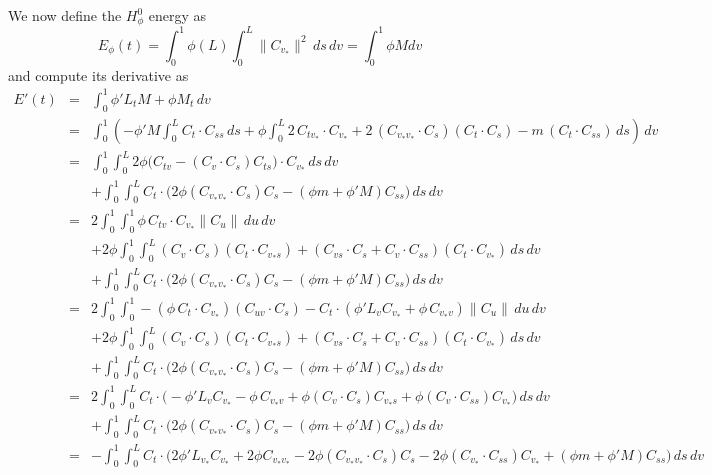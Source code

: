 \documentclass[twoside,a4paper,english]{article}
\def\v{{v_*}}
\begin{document}
We now define the $H^0_\phi$ energy as
\begin{equation}
  E_{\phi}(t)=\int_0^1 \phi(L) \int_0^L \big\|C_{\v}\big\|^2\,ds\,dv
      =\int_0^1 \phi M dv
\end{equation}
and compute its derivative as
\begin{eqnarray*}
  E'(t)
  &=& \int_0^1 \phi'L_t M+\phi M_t\,dv  \\
  &=& \int_0^1 \left(
        -\phi'M \int_0^L C_t\cdot C_{ss}\,ds
        +\phi
        \int_0^L 2\,C_{t\v}\cdot C_{\v}
               + 2\,(C_{\v\v}\cdot C_s)(C_t\cdot C_s)
               - m\,(C_t\cdot C_{ss})\,ds
      \right)\,dv \\
  &=& \int_0^1\int_0^L
        2\phi\Big(C_{tv}-(C_v\cdot C_s)C_{ts}\Big)\cdot C_{\v}
      \,ds\,dv
    \\&&
     +\int_0^1\int_0^L
        C_t\cdot\Big(
          2\phi(C_{\v\v}\cdot C_s)C_s-(\phi m+\phi'M)C_{ss}
        \Big)
      \,ds\,dv \\
  &=& 2\int_0^1\int_0^1
        \phi\,C_{tv}\cdot C_{\v}
      \|C_u\|\,du\,dv
    \\&&
     +2\phi\int_0^1\int_0^L
        (C_v\cdot C_s)(C_t\cdot C_{\v s})
       +(C_{vs}\cdot C_s+C_v\cdot C_{ss})(C_t\cdot C_{\v})
      \,ds\,dv
    \\&&
     +\int_0^1\int_0^L
        C_t\cdot\Big(
          2\phi(C_{\v\v}\cdot C_s)C_s-(\phi m+\phi'M)C_{ss}
        \Big)
      \,ds\,dv \\
  &=& 2\int_0^1\int_0^1
       -(\phi\,C_t\cdot C_{\v})(C_{uv}\cdot C_s)
       -C_t\cdot(\phi'L_v C_{\v}+\phi\,C_{\v v})\|C_u\|
      \,du\,dv
    \\&&
     +2\phi\int_0^1\int_0^L
        (C_v\cdot C_s)(C_t\cdot C_{\v s})
       +(C_{vs}\cdot C_s+C_v\cdot C_{ss})(C_t\cdot C_{\v})
      \,ds\,dv
    \\&&
     +\int_0^1\int_0^L
        C_t\cdot\Big(
          2\phi(C_{\v\v}\cdot C_s)C_s-(\phi m+\phi'M)C_{ss}
        \Big)
      \,ds\,dv \\
  &=& 2\int_0^1\int_0^L
        C_t\cdot\Big(
         -\phi'L_v C_{\v}-\phi\,C_{\v v}
         +\phi(C_v\cdot C_s)C_{\v s}
         +\phi(C_v\cdot C_{ss})C_{\v}
        \Big)
      \,ds\,dv
    \\&&
     +\int_0^1\int_0^L
        C_t\cdot\Big(
          2\phi(C_{\v\v}\cdot C_s)C_s-(\phi m+\phi'M)C_{ss}
        \Big)
      \,ds\,dv \\
  &=& -\int_0^1\int_0^L
        C_t\cdot\Big(
          2\phi'L_{\v} C_{\v}
         +2\phi C_{\v\v}-2\phi(C_{\v\v}\cdot C_s)C_s
         -2\phi(C_{\v}\cdot C_{ss})C_{\v}
         +(\phi m+\phi'M)C_{ss}
        \Big)
      \,ds\,dv
\end{eqnarray*}
\end{document}
